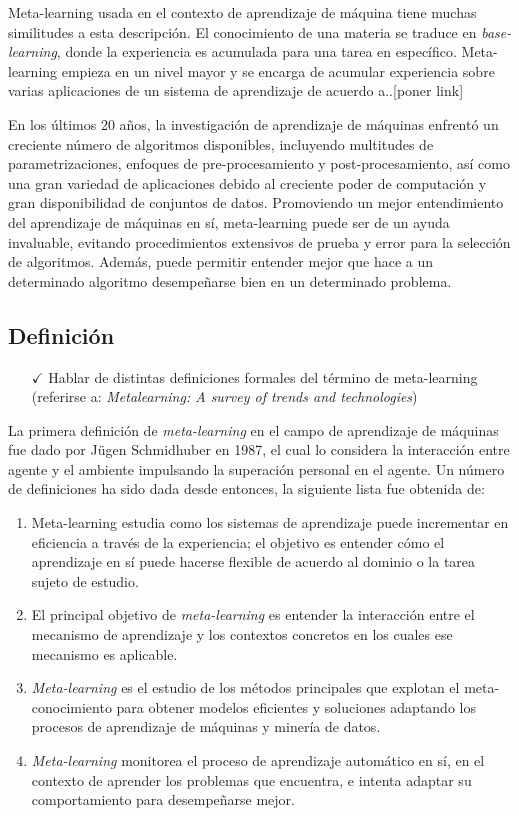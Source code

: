 Meta-learning usada en el contexto de aprendizaje de máquina tiene muchas similitudes a esta descripción. El conocimiento de una materia se traduce en \textit{base-learning}, donde la experiencia es acumulada para una tarea en específico. Meta-learning empieza en un nivel mayor y se encarga de acumular experiencia sobre varias aplicaciones de un sistema de aprendizaje de acuerdo a..[poner link]

En los últimos 20 años, la investigación de aprendizaje de máquinas enfrentó un creciente número de algoritmos disponibles, incluyendo multitudes de parametrizaciones, enfoques de pre-procesamiento y post-procesamiento, así como una gran variedad de aplicaciones debido al creciente poder de computación y gran disponibilidad de conjuntos de datos. Promoviendo un mejor entendimiento del aprendizaje de máquinas en sí, meta-learning puede ser de un ayuda invaluable, evitando procedimientos extensivos de prueba y error para la selección de algoritmos. Además, puede permitir entender mejor que hace a un determinado algoritmo desempeñarse bien en un determinado problema.

\subsection{Definición}\label{subsec:mtl-definition}

\begin{itemize}
	\item[$\checkmark$] Hablar de distintas definiciones formales del término de meta-learning (referirse a:  \textit{Metalearning: A survey of trends and technologies})
\end{itemize}

La primera definición de \textit{meta-learning} en el campo de aprendizaje de máquinas fue dado por J\"ugen Schmidhuber en 1987, el cual lo considera la interacción entre agente y el ambiente impulsando la superación personal en el agente. Un número de definiciones ha sido dada desde entonces, la siguiente lista fue obtenida de:

\begin{enumerate}
	\item Meta-learning estudia como los sistemas de aprendizaje puede incrementar en eficiencia a través de la experiencia; el objetivo es entender cómo el aprendizaje en sí puede hacerse flexible de acuerdo al dominio o la tarea sujeto de estudio.
	\item El principal objetivo de \emph{meta-learning} es entender la interacción entre el mecanismo de aprendizaje y los contextos concretos en los cuales ese mecanismo es aplicable.
	\item \emph{Meta-learning} es el estudio de los métodos principales que explotan el meta-conocimiento para obtener modelos eficientes y soluciones adaptando los procesos de aprendizaje de máquinas y minería de datos.
	\item \emph{Meta-learning} monitorea el proceso de aprendizaje automático en sí, en el contexto de aprender los problemas que encuentra, e intenta adaptar su comportamiento para desempeñarse mejor.
\end{enumerate}


